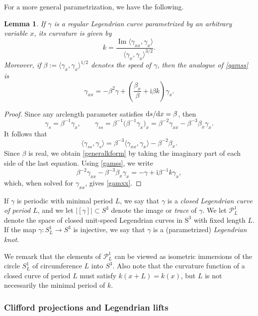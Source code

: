 \documentclass[pdftex]{sigma}
\def\rS{{\mathrm S}}
\newcommand\Legu{ {\mathcal P}^1} %
\newcommand\kk{k} %
\newcommand\speed{\beta} %
\def\ri{\mathrm{i}}
\def\gam{\gamma} %
\renewcommand\Im{\operatorname{Im}}
\numberwithin{equation}{section}
\newtheorem{Lemma}[Theorem]{Lemma}
\begin{document}
For a more general parametrization, we have the following.
\begin{Lemma}
If $\gam$ is a regular Legendrian curve parametrized by an arbitrary variable $x$, its curvature is given by
\begin{equation}\label{generalkform}
 \kk = \dfrac{ \Im \langle \gam_{xx}, \gam_x \rangle}{\quad \langle \gam_x, \gam_x\rangle^{3/2}}.
\end{equation}
Moreover, if $\speed:=\langle \gam_x, \gam_x\rangle^{1/2}$ denotes the {\it speed} of $\gam$,
then the analogue of \eqref{gamss} is
\begin{equation}\label{gamxx}
\gam_{xx} = -\speed^2 \gam + \left( \dfrac{\speed_x}{\speed} + \ri \speed \kk\right) \gam_x.
\end{equation}
\end{Lemma}
\begin{proof} Since any arclength parameter satisfies ${\rm d}s/{\rm d}x=\speed$, then
\[
\gam_s =\speed^{-1} \gam_x , \qquad \gam_{ss}=\speed^{-1}\bigl(\speed^{-1} \gam_x\bigr)_x = \speed^{-2} \gam_{xx}-\speed^{-3} \speed_x \gam_x.
\]
It follows that
\[
\langle \gam_{ss}, \gam_s \rangle=\speed^{-3} \langle \gam_{xx}, \gam_x \rangle -\speed^{-2}\speed_x .
\]
Since $\speed$ is real, we obtain \eqref{generalkform} by taking the imaginary part of each side of the last equation. Using \eqref{gamss}, we write
\[
\speed^{-2} \gam_{xx}-\speed^{-3} \speed_x \gam_x =-\gam +\ri \speed^{-1} k\gam_x,
\]
which, when solved for $\gam_{xx}$, gives \eqref{gamxx}.
\end{proof}

\begin{Definition}
If $\gam$ is periodic with minimal period $L$, we say that $\gam$ is a {\it closed Legendrian curve of period $L$}, and we let $|[\gam]| \subset S^3 $ denote the image or
{\it trace} of $\gam$.
 We let $\Legu_L$ denote the space of closed unit-speed Legendrian curves in $\rS^3$ with fixed length $L$. If the map $\gam\colon S^1_L\to S^3$ is injective, we say that $\gam$ is a (parametrized) {\it Legendrian knot}.
\end{Definition}

We remark that the elements of $\Legu_L$ can be viewed as isometric immersions of the circle $S^1_L$ of circumference $L$ into $S^3$. Also note that the curvature function of a closed curve of period $L$ must satisfy $\kk(x+L)=\kk(x)$, but $L$ is not necessarily the
minimal period of $\kk$.


\subsubsection*{Clifford projections and Legendrian lifts}
\end{document}
